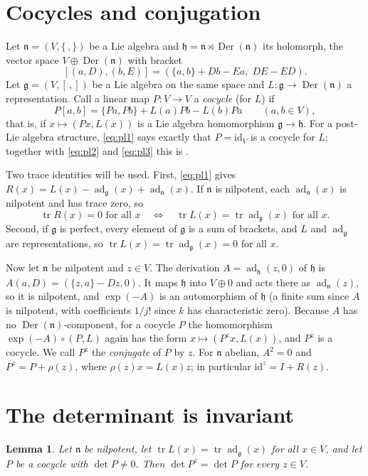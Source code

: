 \documentclass[11pt]{article}
\newtheorem{lemma}[theorem]{Lemma}
\theoremstyle{definition}
\theoremstyle{remark}
\newcommand{\g}{\mathfrak{g}}
\newcommand{\n}{\mathfrak{n}}
\newcommand{\h}{\mathfrak{h}}
\DeclareMathOperator{\ad}{ad}
\DeclareMathOperator{\tr}{tr}
\DeclareMathOperator{\Der}{Der}
\begin{document}
\section{Cocycles and conjugation}\label{sec:setup}
Let $\n=(V,\{\,,\})$ be a Lie algebra and $\h=\n\rtimes\Der(\n)$ its
holomorph, the vector space $V\oplus\Der(\n)$ with bracket
\[
[(a,D),(b,E)]=(\{a,b\}+Db-Ea,\;DE-ED).
\]
Let $\g=(V,[\,,])$ be a Lie algebra on the same space and
$L\colon\g\to\Der(\n)$ a representation. Call a linear map
$P\colon V\to V$ a \emph{cocycle} (for $L$) if
\begin{equation}\label{eq:cocycle}
P[a,b]=\{Pa,Pb\}+L(a)Pb-L(b)Pa\qquad(a,b\in V),
\end{equation}
that is, if $x\mapsto(Px,L(x))$ is a Lie algebra homomorphism
$\g\to\h$. For a post-Lie algebra structure, \eqref{eq:pl1} says exactly
that $P=\mathrm{id}_V$ is a cocycle for $L$; together with \eqref{eq:pl2}
and \eqref{eq:pl3} this is \cite[Proposition 2.13]{BDV}.

Two trace identities will be used. First, \eqref{eq:pl1} gives
$R(x)=L(x)-\ad_\g(x)+\ad_\n(x)$. If $\n$ is nilpotent, each $\ad_\n(x)$
is nilpotent and has trace zero, so
\begin{equation}\label{eq:trace}
\tr R(x)=0\text{ for all }x\quad\Longleftrightarrow\quad
\tr L(x)=\tr\ad_\g(x)\text{ for all }x.
\end{equation}
Second, if $\g$ is perfect, every element of $\g$ is a sum of brackets,
and $L$ and $\ad_\g$ are representations, so $\tr L(x)=\tr\ad_\g(x)=0$
for all $x$.

Now let $\n$ be nilpotent and $z\in V$. The derivation $A=\ad_\h(z,0)$
of $\h$ is $A(a,D)=(\{z,a\}-Dz,0)$. It maps $\h$ into $V\oplus0$ and acts
there as $\ad_\n(z)$, so it is nilpotent, and $\exp(-A)$ is an
automorphism of $\h$ (a finite sum since $A$ is nilpotent, with
coefficients $1/j!$ since $k$ has characteristic zero).
Because $A$ has no $\Der(\n)$-component, for a cocycle $P$ the
homomorphism $\exp(-A)\circ(P,L)$ again has the form $x\mapsto(P^zx,L(x))$,
and $P^z$ is a cocycle. We call $P^z$ the \emph{conjugate} of $P$ by $z$.
For $\n$ abelian, $A^2=0$ and $P^z=P+\rho(z)$, where $\rho(z)x=L(x)z$;
in particular $\mathrm{id}^z=I+R(z)$.

\section{The determinant is invariant}

\begin{lemma}\label{lem:det}
Let $\n$ be nilpotent, let $\tr L(x)=\tr\ad_\g(x)$ for all $x\in V$, and
let $P$ be a cocycle with $\det P\ne0$. Then $\det P^z=\det P$ for every
$z\in V$.
\end{lemma}
\end{document}

